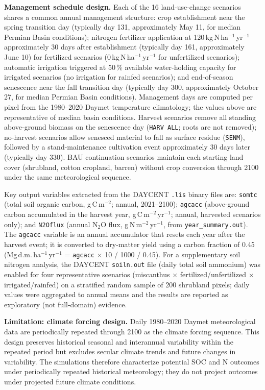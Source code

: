 \documentclass[11pt]{article}
\begin{document}
\textbf{Management schedule design.} Each of the 16 land-use-change scenarios shares a common annual management structure: crop establishment near the spring transition day (typically day 131, approximately May 11, for median Permian Basin conditions); nitrogen fertilizer application at 120\,kg\,N\,ha$^{-1}$\,yr$^{-1}$ approximately 30 days after establishment (typically day 161, approximately June 10) for fertilized scenarios (0\,kg\,N\,ha$^{-1}$\,yr$^{-1}$ for unfertilized scenarios); automatic irrigation triggered at 50\,\% available water-holding capacity for irrigated scenarios (no irrigation for rainfed scenarios); and end-of-season senescence near the fall transition day (typically day 300, approximately October 27, for median Permian Basin conditions). Management days are computed per pixel from the 1980--2020 Daymet temperature climatology; the values above are representative of median basin conditions. Harvest scenarios remove all standing above-ground biomass on the senescence day (\texttt{HARV ALL}; roots are not removed); no-harvest scenarios allow senesced material to fall as surface residue (\texttt{SENM}), followed by a stand-maintenance cultivation event approximately 30 days later (typically day 330). BAU continuation scenarios maintain each starting land cover (shrubland, cotton cropland, barren) without crop conversion through 2100 under the same meteorological sequence.

Key output variables extracted from the DAYCENT \texttt{.lis} binary files are: \texttt{somtc} (total soil organic carbon, g\,C\,m$^{-2}$; annual, 2021--2100); \texttt{agcacc} (above-ground carbon accumulated in the harvest year, g\,C\,m$^{-2}$\,yr$^{-1}$; annual, harvested scenarios only); and \texttt{N2Oflux} (annual N$_2$O flux, g\,N\,m$^{-2}$\,yr$^{-1}$, from \texttt{year\_summary.out}). The \texttt{agcacc} variable is an annual accumulator that resets each year after the harvest event; it is converted to dry-matter yield using a carbon fraction of 0.45 (Mg\,d.m.\,ha$^{-1}$\,yr$^{-1}$ = \texttt{agcacc} $\times$ 10 / 1000 / 0.45). For a supplementary soil nitrogen analysis, the DAYCENT \texttt{soiln.out} file (daily total soil ammonium) was enabled for four representative scenarios (miscanthus $\times$ fertilized/unfertilized $\times$ irrigated/rainfed) on a stratified random sample of 200 shrubland pixels; daily values were aggregated to annual means and the results are reported as exploratory (not full-domain) evidence.

\textbf{Limitation: climate forcing design.} Daily 1980--2020 Daymet meteorological data are periodically repeated through 2100 as the climate forcing sequence. This design preserves historical seasonal and interannual variability within the repeated period but excludes secular climate trends and future changes in variability. The simulations therefore characterize potential SOC and N outcomes under periodically repeated historical meteorology; they do not project outcomes under projected future climate conditions.
\end{document}
